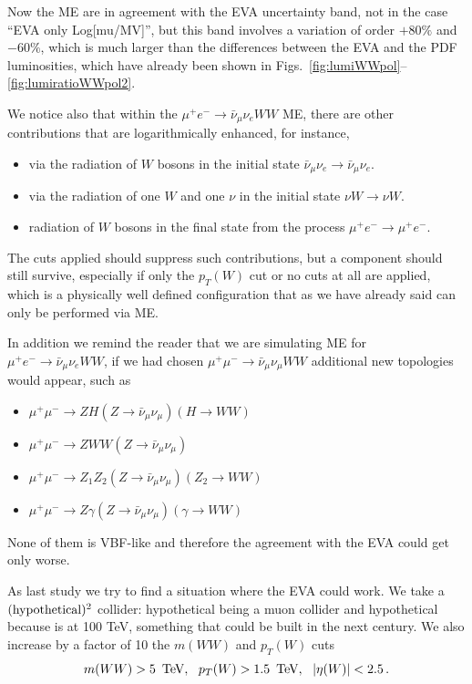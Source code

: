 \documentclass[a4paper,11pt]{article}
\begin{document}
Now the ME are in agreement with the EVA uncertainty band, not in the case ``EVA only Log[mu/MV]'', but this band involves a variation of order $+80\%$ and $-60\%$, which is much larger than the differences between the EVA and the PDF luminosities, which have already been shown in Figs.~\ref{fig:lumiWWpol}--\ref{fig:lumiratioWWpol2}.

We notice also that within the $\mu^+e^-\to\bar \nu_\mu \nu_e WW$ ME, there are other contributions that are logarithmically enhanced, for instance,
\begin{itemize}
\item via the radiation of $W$ bosons in the initial state $\bar \nu_\mu \nu_e \to \bar \nu_\mu \nu_e $.
\item via the radiation of one $W$  and one $\nu$ in the initial state $\nu W \to \nu W  $.
\item radiation of $W$ bosons in the final state from the process  $\mu^+e^-\to \mu^+e^-$.
\end{itemize}

The cuts applied should suppress such contributions, but a component should still survive, especially if only the $p_T(W)$ cut or no cuts at all are applied, which is a physically well defined configuration that as we have already said can only be performed via ME.

In addition we remind the reader that we are simulating ME for  $\mu^+e^-\to\bar \nu_\mu \nu_e WW$, if we had chosen $\mu^+\mu^-\to\bar \nu_\mu \nu_\mu WW$ additional new topologies would appear, such as

\begin{itemize}
\item $\mu^+\mu^-\to ZH (Z\to \bar \nu_\mu \nu_\mu ) (H \to WW )$
\item $\mu^+\mu^-\to ZWW (Z\to \bar \nu_\mu \nu_\mu ) $
\item $\mu^+\mu^-\to Z_1Z_2 (Z\to \bar \nu_\mu \nu_\mu ) (Z_2 \to WW) $
\item $\mu^+\mu^-\to Z \gamma (Z\to \bar \nu_\mu \nu_\mu ) (\gamma \to WW) $
\end{itemize}

None of them is VBF-like and therefore the agreement with the EVA could get only worse.

As last study we try to find a situation where the EVA could work. We take a $(\rm hypothetical)^2$ collider: hypothetical being a muon collider and hypothetical because is at 100 TeV, something that could be built in the next century. We also increase by a factor of 10 the $m(WW)$ and $p_T(W)$ cuts 
\begin{equation}
m(WW) > 5~\,\textrm{TeV}, ~~p_T(W) > 1.5~\,\textrm{TeV},~~ |\eta(W)|<2.5 \,.
\end{equation}
\end{document}
